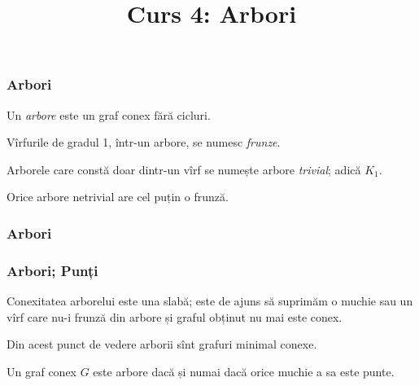 
\title{Curs 4: Arbori}



\maketitle

\begin{frame}
  \frametitle{Arbori}

Un \emph{arbore} este un graf conex fără cicluri.\pause

Vîrfurile de gradul 1, într-un arbore, se numesc \emph{frunze}.\pause

Arborele care constă doar dintr-un vîrf se numește arbore \emph{trivial}; adică $K_1$.\pause

Orice arbore netrivial are cel puțin o frunză.

\end{frame}

\begin{frame}
  \frametitle{Arbori}

\begin{figure}
\centering%
\end{figure}

\end{frame}

\begin{frame}
  \frametitle{Arbori; Punți}

Conexitatea arborelui este una slabă; este de ajuns să suprimăm o muchie sau un vîrf care nu-i frunză din arbore și graful obținut nu mai este conex.

Din acest punct de vedere arborii sînt grafuri minimal conexe.\pause

\begin{theorem}
Un graf conex $G$ este arbore dacă și numai dacă orice muchie a sa este punte.
\end{theorem}
\end{frame}


